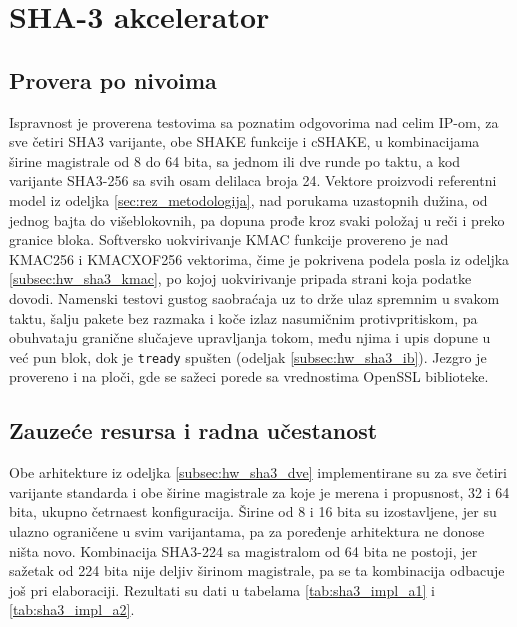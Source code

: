 \section{SHA-3 akcelerator}
\label{sec:rez_sha3}

\subsection{Provera po nivoima}
\label{subsec:rez_sha3_provera}

Ispravnost je proverena testovima sa poznatim odgovorima nad celim IP-om, za sve četiri SHA3 varijante, obe SHAKE funkcije i cSHAKE, u kombinacijama širine magistrale od 8 do 64 bita, sa jednom ili dve runde po taktu, a kod varijante SHA3-256 sa svih osam delilaca broja 24. Vektore proizvodi referentni model iz odeljka \ref{sec:rez_metodologija}, nad porukama uzastopnih dužina, od jednog bajta do višeblokovnih, pa dopuna prođe kroz svaki položaj u reči i preko granice bloka. Softversko uokvirivanje KMAC funkcije provereno je nad KMAC256 i KMACXOF256 vektorima, čime je pokrivena podela posla iz odeljka \ref{subsec:hw_sha3_kmac}, po kojoj uokvirivanje pripada strani koja podatke dovodi.
\smallbreak
Namenski testovi gustog saobraćaja uz to drže ulaz spremnim u svakom taktu, šalju pakete bez razmaka i koče izlaz nasumičnim protivpritiskom, pa obuhvataju granične slučajeve upravljanja tokom, među njima i upis dopune u već pun blok, dok je \texttt{tready} spušten (odeljak \ref{subsec:hw_sha3_ib}). Jezgro je provereno i na ploči, gde se sažeci porede sa vrednostima OpenSSL biblioteke.

\subsection{Zauzeće resursa i radna učestanost}
\label{subsec:rez_sha3_resursi}

Obe arhitekture iz odeljka \ref{subsec:hw_sha3_dve} implementirane su za sve četiri varijante standarda i obe širine magistrale za koje je merena i propusnost, 32 i 64 bita, ukupno četrnaest konfiguracija. Širine od 8 i 16 bita su izostavljene, jer su ulazno ograničene u svim varijantama, pa za poređenje arhitektura ne donose ništa novo. Kombinacija SHA3-224 sa magistralom od 64 bita ne postoji, jer sažetak od 224 bita nije deljiv širinom magistrale, pa se ta kombinacija odbacuje još pri elaboraciji. Rezultati su dati u tabelama \ref{tab:sha3_impl_a1} i \ref{tab:sha3_impl_a2}.

